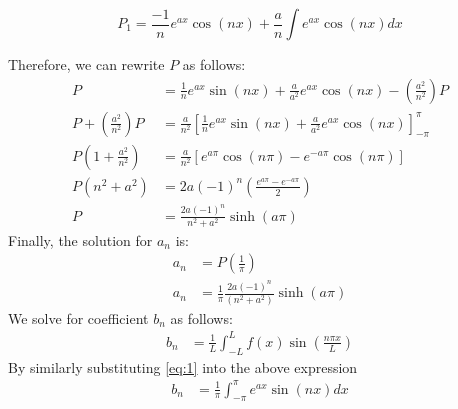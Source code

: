 \documentclass[12pt,a4paper]{article}
\begin{document}
\begin{enumerate}
\[P_1=\frac{-1}{n}e^{ax} \cos(nx) + \frac{a}{n} \int e^{ax}\cos(nx)dx\]

Therefore,  we can rewrite $P$  as follows: 
\begin{align*}
 P &=\frac{1}{n}e^{ax}\sin(nx)+ \frac{a}{a^2}e^{ax}\cos(nx)-\left(\frac{a^2}{n^2}\right)P\\
P+\left(\frac{a^2}{n^2}\right)P&=\frac{a}{n^2}\left[\frac{1}{n}e^{ax}\sin(nx)+ \frac{a}{a^2}e^{ax}\cos(nx)\right]_{-\pi}^{\pi}\\
P\left( 1 + \frac{a^2}{n^2}\right)&=\frac{a}{n^2}\left[e^{a\pi}\cos(n\pi) - e^{-a\pi}\cos(n\pi)\right]\\
P(n^2+a^2)&=2a(-1)^{n}\left(\frac{e^{a\pi}-e^{-a\pi}}{2}\right)\\
P &=\frac{2a(-1)^{n}}{n^{2}+a^{2} }\sinh(a\pi)
\end{align*}
Finally, the solution for $ a_n $ is: \\
\begin{align*}
a_n &=P (\frac{1}{\pi})\\
a_n &=\frac{1}{\pi}  \frac{2a(-1)^{n}}{ (n^{2}+a^{2} )} \sinh(a\pi)
\end{align*}
We solve for coefficient $b_n$ as follows:\\
\begin{align*}
		 b_n &=\frac{1}{L}\int_{-L}^{L}f(x)\sin\left(\frac{n\pi x}{L}\right)
\end{align*}
By similarly substituting \eqref{eq:1} into the above expression\\
\begin{align*}
  b_n  &=\frac{1}{\pi}\int_{-\pi}^{\pi} e^{ax}\sin(nx)dx
\end{align*}


\end{enumerate}
\end{document}
